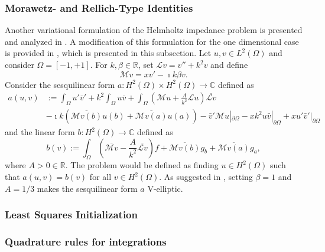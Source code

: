 \subsubsection{Morawetz- and Rellich-Type Identities}\label{sec:vpinnsformulationhq}
Another variational formulation of the Helmholtz impedance problem is presented and analyzed in \cite{moiola2014helmholtz}. A modification of this formulation for the one dimensional case is provided in \cite{henriquez2022}, which is presented in this subsection. Let $u, v \in L^2(\Omega)$ and consider $\Omega=[-1,+1]$. For $k, \beta \in \mathbb{R}$, set $\mathcal{L}v= v''+k^2v$ and define
\begin{equation}
    \mathcal{M}v=xv'-\imath k \beta v.
\end{equation}
Consider the sesquilinear form $a:H^2(\Omega)\times H^2(\Omega) \to \mathbb{C}$ defined as
\begin{equation}
    \begin{split}
        a(u, v) & := \int_{\Omega}{u'\bar{v}'} + k^2 \int_{\Omega}{u\bar{v}} + \int_{\Omega} \left ( \mathcal{M}u + \frac{A}{k^2}\mathcal{L}u\right )\overline{\mathcal{L}v} \\ & - \imath k (\overline{\mathcal{M}v(b)}u(b) + \overline{\mathcal{M}v(a)}u(a)) - \bar{v}'\mathcal{M}u|_{\partial \Omega} - xk^2u\bar{v}|_{\partial \Omega} + xu'\bar{v}'|_{\partial \Omega}
    \end{split}
\end{equation}
and the linear form $b:H^2(\Omega) \to \mathbb{C}$ defined as
\begin{equation}
    b(v) := \int_{\Omega}{\left ( \overline{\mathcal{M}v} - \frac{A}{k^2} \overline{\mathcal{L}v} \right )f + \overline{\mathcal{M}v(b)}g_b + \overline{\mathcal{M}v(a)}g_a},
\end{equation}
where $A>0 \in \mathbb{R}$. The problem would be defined as finding $u \in H^2(\Omega)$ such that $a(u,v)=b(v)$ for all $v \in H^2(\Omega)$. As suggested in \cite{henriquez2022}, setting $\beta = 1$ and $A = 1/3$ makes the sesquilinear form $a$ V-elliptic.

\subsubsection{Least Squares Initialization}\label{sec:lsinit}


\subsubsection{Quadrature rules for integrations}\label{sec:quadraturerules}

